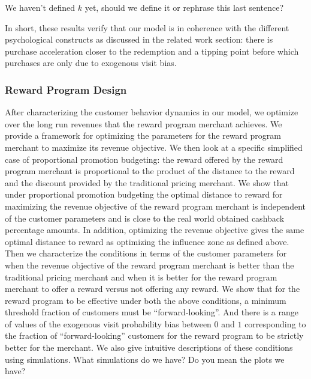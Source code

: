 {\nolan We haven't defined $k$ yet, should we define it or rephrase this last sentence?}

In short, these results verify that our model is in coherence with the different psychological constructs as discussed in the related work section: there is purchase acceleration closer to the redemption and a tipping point before which purchases are only due to exogenous visit bias.

\subsubsection{Reward Program Design}
After characterizing the customer behavior dynamics in our model, we optimize over the long run revenues that the reward program merchant achieves.
We provide a framework for optimizing the parameters for the reward program merchant to maximize its revenue objective.
We then look at a specific simplified case of proportional promotion budgeting: the reward offered by the reward program merchant is proportional to the product of the distance to the reward and the discount provided by the traditional pricing merchant.
We show that under proportional promotion budgeting the optimal distance to reward for maximizing the revenue objective of the reward program merchant is independent of the customer parameters and is close to the real world obtained cashback percentage amounts.
In addition, optimizing the revenue objective gives the same optimal distance to reward as optimizing the influence zone as defined above.
Then we characterize the conditions in terms of the customer parameters for when the revenue objective of the reward program merchant is better than the traditional pricing merchant and when it is better for the reward program merchant to offer a reward versus not offering any reward.
We show that for the reward program to be effective under both the above conditions, a minimum threshold fraction of customers must be ``forward-looking''.
And there is a range of values of the exogenous visit probability bias between $0$ and $1$ corresponding to the fraction of ``forward-looking'' customers for the reward program to be strictly better for the merchant. 
We also give intuitive descriptions of these conditions using simulations. {\nolan What simulations do we have? Do you mean the plots we have?}
